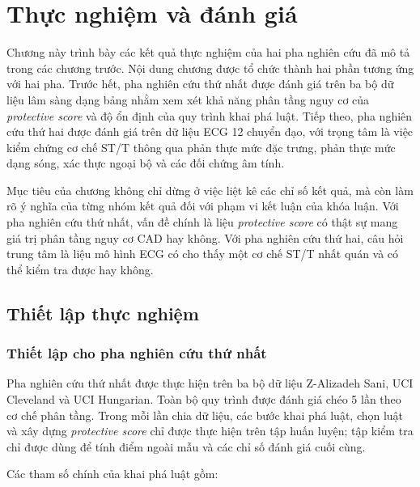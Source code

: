 \clearpage
{}

\setcounter{chapter}{3}
\chapter[{THỰC NGHIỆM VÀ ĐÁNH GIÁ}]{Thực nghiệm và đánh giá}

Chương này trình bày các kết quả thực nghiệm của hai pha nghiên cứu đã mô tả trong các chương trước. Nội dung chương được tổ chức thành hai phần tương ứng với hai pha. Trước hết, pha nghiên cứu thứ nhất được đánh giá trên ba bộ dữ liệu lâm sàng dạng bảng nhằm xem xét khả năng phân tầng nguy cơ của \textit{protective score} và độ ổn định của quy trình khai phá luật. Tiếp theo, pha nghiên cứu thứ hai được đánh giá trên dữ liệu ECG 12 chuyển đạo, với trọng tâm là việc kiểm chứng cơ chế ST/T thông qua phản thực mức đặc trưng, phản thực mức dạng sóng, xác thực ngoại bộ và các đối chứng âm tính.

\blocksep

Mục tiêu của chương không chỉ dừng ở việc liệt kê các chỉ số kết quả, mà còn làm rõ ý nghĩa của từng nhóm kết quả đối với phạm vi kết luận của khóa luận. Với pha nghiên cứu thứ nhất, vấn đề chính là liệu \textit{protective score} có thật sự mang giá trị phân tầng nguy cơ CAD hay không. Với pha nghiên cứu thứ hai, câu hỏi trung tâm là liệu mô hình ECG có cho thấy một cơ chế ST/T nhất quán và có thể kiểm tra được hay không.

\section{Thiết lập thực nghiệm}

\blocksep

\subsection{Thiết lập cho pha nghiên cứu thứ nhất}

\blocksep

Pha nghiên cứu thứ nhất được thực hiện trên ba bộ dữ liệu Z-Alizadeh Sani, UCI Cleveland và UCI Hungarian. Toàn bộ quy trình được đánh giá chéo 5 lần theo cơ chế phân tầng. Trong mỗi lần chia dữ liệu, các bước khai phá luật, chọn luật và xây dựng \textit{protective score} chỉ được thực hiện trên tập huấn luyện; tập kiểm tra chỉ được dùng để tính điểm ngoài mẫu và các chỉ số đánh giá cuối cùng.

\blocksep

Các tham số chính của khai phá luật gồm:

